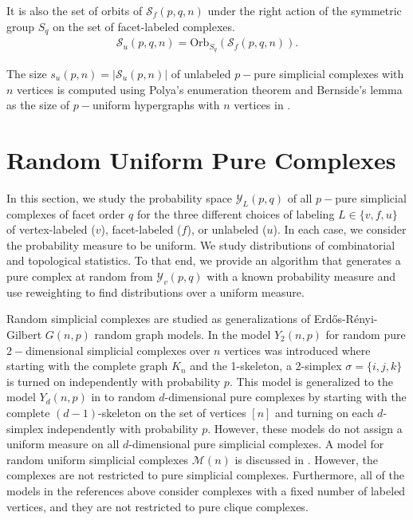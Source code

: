 \documentclass[12pt]{article}
\theoremstyle{plain}
\theoremstyle{definition}
\theoremstyle{remark}
\begin{document}
It is also the set of orbits of $\mathcal{S}_f(p,q,n)$ under the right action of the symmetric group $S_q$ on the set of facet-labeled complexes.
\begin{align}
    \mathcal{S}_u(p,q,n) = \mathrm{Orb}_{S_q}(\mathcal{S}_f(p,q,n)).
\end{align}

The size $s_u(p,n)=|\mathcal{S}_u(p,n)|$ of unlabeled $p-$pure simplicial complexes with $n$ vertices is computed using Polya's enumeration theorem and Bernside's lemma as the size of $p-$uniform hypergraphs with $n$ vertices in \cite{QIAN201466}.

\section{Random Uniform Pure Complexes}
\label{sec:randomPure}
In this section, we study the probability space $\mathcal{Y}_{L}(p,q)$ of all $p-$pure simplicial complexes of facet order $q$ for the three different choices of labeling $L\in\{v, f, u\}$ of vertex-labeled ($v$), facet-labeled ($f$), or unlabeled ($u$). In each case, we consider the probability measure to be uniform.  We study distributions of combinatorial and topological statistics. To that end, we provide an algorithm that generates a pure complex at random from $\mathcal{Y}_v(p,q)$ with a known probability measure and use reweighting to find distributions over a uniform measure.

Random simplicial complexes are studied as generalizations of Erd\H{o}s-R\'{e}nyi-Gilbert $G(n,p)$ random graph models. In \cite{linial2006homological} the model $Y_2(n,p)$ for random pure $2-$dimensional simplicial complexes over $n$ vertices was introduced where starting with the complete graph $K_n$ and the 1-skeleton, a 2-simplex $\sigma=\{i,j,k\}$ is turned on independently with probability $p$. This model is generalized to the model $Y_d(n,p)$ in \cite{meshulam2009homological} to random $d$-dimensional pure complexes by starting with the complete $(d-1)$-skeleton on the set of vertices $[n]$ and turning on each $d$-simplex independently with probability $p$. However, these models do not assign a uniform measure on all $d$-dimensional pure simplicial complexes. A model for random uniform simplicial complexes $\mathcal{M}(n)$ is discussed in \cite{markstrom2020random}. However, the complexes are not restricted to pure simplicial complexes. Furthermore, all of the models in the references above consider complexes with a fixed number of labeled vertices, and they are not restricted to pure clique complexes.
 
\end{document}
